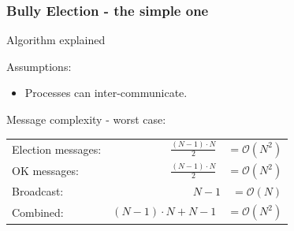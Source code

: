\documentclass[10pt]{beamer}
\begin{document}
\begin{frame}
  \frametitle{Bully Election - the simple one}
  Algorithm explained

  Assumptions:
  \begin{itemize}
    \item Processes can inter-communicate.
  \end{itemize}

  \vspace*{2em}
  \centering
  Message complexity - worst case:
  \begin{table}
    \begin{tabular}{@{} lr @{}}
      \toprule
      Election messages: & $\frac{(N-1)\cdot N}{2} \quad = \mathcal{O}(N^2)$ \\ 
      OK messages: & $\frac{(N-1)\cdot N}{2} \quad = \mathcal{O}(N^2)$ \\ 
      Broadcast: & $N-1 \quad = \mathcal{O}(N)$ \\
      Combined: & $(N-1)\cdot N + N - 1 \quad = \mathcal{O}(N^2)$\\
      \bottomrule
    \end{tabular}
  \end{table}
\end{frame}
\end{document}
